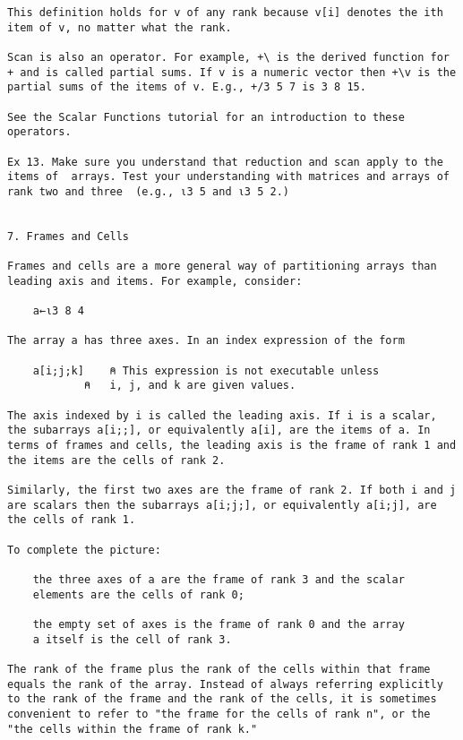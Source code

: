 \documentclass{article}
\begin{document}
\begin{verbatim}
This definition holds for v of any rank because v[i] denotes the ith  
item of v, no matter what the rank.                                   

Scan is also an operator. For example, +\ is the derived function for 
+ and is called partial sums. If v is a numeric vector then +\v is the
partial sums of the items of v. E.g., +/3 5 7 is 3 8 15.              

See the Scalar Functions tutorial for an introduction to these        
operators.                                                            

Ex 13. Make sure you understand that reduction and scan apply to the  
items of  arrays. Test your understanding with matrices and arrays of 
rank two and three  (e.g., ⍳3 5 and ⍳3 5 2.)                          


7. Frames and Cells                                                   

Frames and cells are a more general way of partitioning arrays than   
leading axis and items. For example, consider:                        

	a←⍳3 8 4                                                             

The array a has three axes. In an index expression of the form        

	a[i;j;k] 	⍝ This expression is not executable unless 
			⍝   i, j, and k are given values.       

The axis indexed by i is called the leading axis. If i is a scalar,   
the subarrays a[i;;], or equivalently a[i], are the items of a. In    
terms of frames and cells, the leading axis is the frame of rank 1 and
the items are the cells of rank 2.                                    

Similarly, the first two axes are the frame of rank 2. If both i and j
are scalars then the subarrays a[i;j;], or equivalently a[i;j], are   
the cells of rank 1.                                                  

To complete the picture:                                              

	the three axes of a are the frame of rank 3 and the scalar 
	elements are the cells of rank 0;

	the empty set of axes is the frame of rank 0 and the array
	a itself is the cell of rank 3.

The rank of the frame plus the rank of the cells within that frame    
equals the rank of the array. Instead of always referring explicitly  
to the rank of the frame and the rank of the cells, it is sometimes   
convenient to refer to "the frame for the cells of rank n", or the    
"the cells within the frame of rank k."                               


\end{verbatim}
\end{document}
